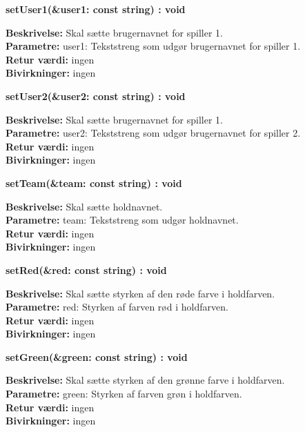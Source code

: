 \documentclass[Arkitektur/System_main.tex]{subfiles}
\begin{document}
\textbf{setUser1(\&user1: const string) : void}
\begin{adjustwidth}{1cm}{0pt}
\textbf{Beskrivelse:} Skal sætte brugernavnet for spiller 1.\\
\textbf{Parametre:} user1: Tekststreng som udgør brugernavnet for spiller 1. \\[0.2cm]
\textbf{Retur værdi:} ingen \\[0.2cm]
\textbf{Bivirkninger:} ingen \\[0.2cm]
\end{adjustwidth}

\textbf{setUser2(\&user2: const string) : void}
\begin{adjustwidth}{1cm}{0pt}
\textbf{Beskrivelse:} Skal sætte brugernavnet for spiller 1.\\
\textbf{Parametre:} user2: Tekststreng som udgør brugernavnet for spiller 2. \\[0.2cm]
\textbf{Retur værdi:} ingen \\[0.2cm]
\textbf{Bivirkninger:} ingen \\[0.2cm]
\end{adjustwidth}

\textbf{setTeam(\&team: const string) : void}
\begin{adjustwidth}{1cm}{0pt}
\textbf{Beskrivelse:} Skal sætte holdnavnet.\\
\textbf{Parametre:} team: Tekststreng som udgør holdnavnet. \\[0.2cm]
\textbf{Retur værdi:} ingen \\[0.2cm]
\textbf{Bivirkninger:} ingen \\[0.2cm]
\end{adjustwidth}

\textbf{setRed(\&red: const string) : void}
\begin{adjustwidth}{1cm}{0pt}
\textbf{Beskrivelse:} Skal sætte styrken af den røde farve i holdfarven.\\
\textbf{Parametre:} red: Styrken af farven rød i holdfarven. \\[0.2cm]
\textbf{Retur værdi:} ingen \\[0.2cm]
\textbf{Bivirkninger:} ingen \\[0.2cm]
\end{adjustwidth}

\textbf{setGreen(\&green: const string) : void}
\begin{adjustwidth}{1cm}{0pt}
\textbf{Beskrivelse:} Skal sætte styrken af den grønne farve i holdfarven.\\
\textbf{Parametre:} green: Styrken af farven grøn i holdfarven. \\[0.2cm]
\textbf{Retur værdi:} ingen \\[0.2cm]
\textbf{Bivirkninger:} ingen \\[0.2cm]
\end{adjustwidth}
\end{document}
